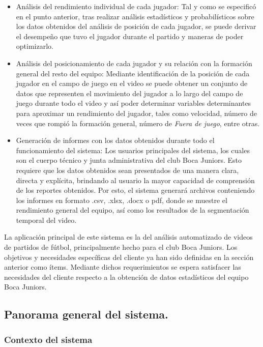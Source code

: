 \documentclass[a4paper]{article}
\newcommand\tab[1][0.55cm]{\hspace*{#1}}
\begin{document}
{\begin{itemize}
        \item Análisis del rendimiento individual de cada jugador: Tal y como se especificó en el punto anterior, tras realizar análisis estadísticos y probabilísticos sobre los datos obtenidos del análisis de posición de cada jugador, se puede derivar el desempeño que tuvo el jugador durante el partido y maneras de poder optimizarlo. 
        \item Análisis del posicionamiento de cada jugador y su relación con la formación general del resto del equipo: Mediante identificación de la posición de cada jugador en el campo de juego en el video se puede obtener un conjunto de datos que representen el movimiento del jugador a lo largo del campo de juego durante todo el video y así poder determinar variables determinantes para aproximar un rendimiento del jugador, tales como velocidad, número de veces que rompió la formación general, número de \textit{Fuera de juego}, entre otras.  
        \item Generación de informes con los datos obtenidos durante todo el funcionamiento del sistema: Los usuarios principales del sistema, los cuales son el cuerpo técnico y junta administrativa del club Boca Juniors. Esto requiere que los datos obtenidos sean presentados de una manera clara, directa y explícita, brindando al usuario la mayor capacidad de comprensión de los reportes obtenidos. Por esto, el sistema generará archivos conteniendo los informes en formato .csv, .xlsx, .docx o pdf, donde se muestre el rendimiento general del equipo, así como los resultados de la segmentación temporal del video. 
    \end{itemize}
    
	\tab La aplicación principal de este sistema es la del análisis automatizado de videos de partidos de fútbol, principalmente hecho para el club Boca Juniors. Los objetivos y necesidades específicas del cliente ya han sido definidas en la sección anterior como ítems. Mediante dichos requerimientos se espera satisfacer las necesidades del cliente respecto a la obtención de datos estadísticos del equipo Boca Juniors. \\

\color{Blue}
\subsection{Panorama general del sistema.}
\color{black}
\justify 

\color{Blue}
\subsubsection{Contexto del sistema}
\color{black}
\justify 

}
\end{document}
